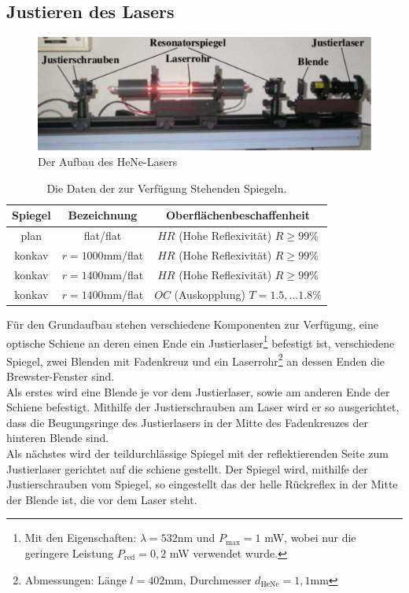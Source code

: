 \subsection{Justieren des Lasers}
\begin{figure}[h!]
\centering
\includegraphics[scale=0.75]{../Grafiken/Aufbau.pdf}
\caption{Der Aufbau des HeNe-Lasers\cite{V61}}\label{Aufbau}
\end{figure}
\FloatBarrier
\begin{table}[h!]
\centering
\begin{tabular}{c c c}
Spiegel & Bezeichnung & Oberflächenbeschaffenheit \\\hline
plan & flat/flat & $HR$ (Hohe Reflexivität) $R\ge 99\%$\\
konkav & $r=1000$mm/flat & $HR$ (Hohe Reflexivität) $R\ge 99\%$\\
konkav & $r=1400$mm/flat & $HR$ (Hohe Reflexivität) $R\ge 99\%$\\
konkav & $r=1400$mm/flat & $OC$ (Auskopplung) $T=1.5,...1.8\% $
\end{tabular}
\caption{Die Daten der zur Verfügung Stehenden Spiegeln.\cite{V61}\label{Eigenschaften}}
\end{table}
\FloatBarrier
Für den Grundaufbau stehen verschiedene Komponenten zur Verfügung, eine optische Schiene an deren einen Ende ein Justierlaser\footnote{Mit den Eigenschaften: $\lambda=532$nm und $P_{\text{max}}=1$ mW, wobei nur die geringere Leistung $P_{\text{red}}=0,2$ mW verwendet wurde.} befestigt ist, verschiedene Spiegel, zwei Blenden mit Fadenkreuz und ein Laserrohr\footnote{Abmessungen: Länge $l=402$mm, Durchmesser $d_{\text{HeNe}}=1,1$mm} an dessen Enden die Brewster-Fenster sind.\\ 
Als erstes wird eine Blende je vor dem Justierlaser, sowie am anderen Ende der Schiene befestigt. Mithilfe der Justierschrauben am Laser wird er so ausgerichtet, dass die Beugungsringe des Justierlasers in der Mitte des Fadenkreuzes der hinteren Blende sind.\\
Als nächstes wird der teildurchlässige Spiegel mit der reflektierenden Seite zum Justierlaser gerichtet auf die schiene gestellt. Der Spiegel wird, mithilfe der Justierschrauben vom Spiegel, so eingestellt das der helle Rückreflex in der Mitte der Blende ist, die vor dem Laser steht.\\ 
